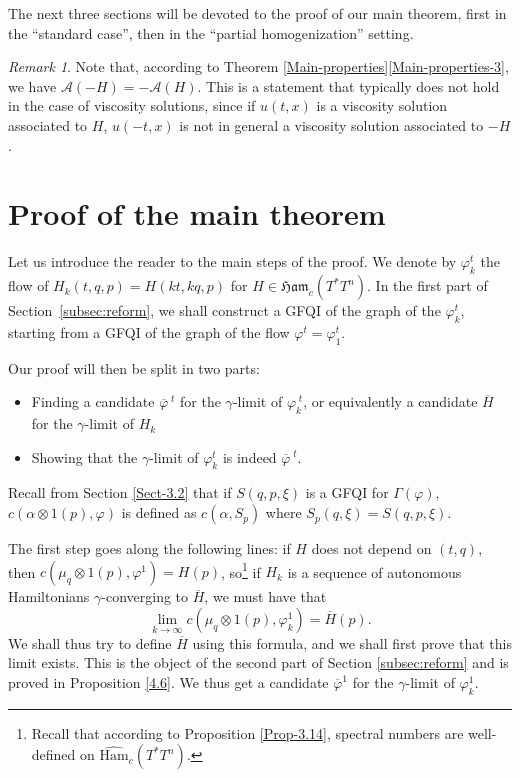 \documentclass[JEP,XML,SOM,NoFloatCountersInSection,Unicode,published]{cedram}
\numberwithin{equation}{section}
\newcommand {\Ham}{{\mathfrak {Ham}}}
\newcommand {\DHam}{\mathrm{Ham}}
\newcommand{\gclDHamc}[1]{\widehat{\DHam}_c(#1)}
\newcommand{\GFQI}{\textup{GFQI}\xspace}
\let \phi \varphi
\theoremstyle{plain}
\theoremstyle{definition}
\theoremstyle{remark}
\newtheorem{remark}[theorem]{Remark}
\begin{document}
The next three sections will be devoted to the proof of our main
theorem, first in the ``standard case'', then in the ``partial homogenization'' setting.

\begin{remark} \label{rem-4.7}
Note that, according to Theorem \ref{Main-properties}\eqref{Main-properties-3}, we have ${\mathcal A}(-H)= -{ \mathcal A }(H)$. This is a statement that typically does not hold in the case of viscosity solutions, since if $u(t,x)$ is a viscosity solution associated to $H$, $u(-t,x)$ is not in general a viscosity solution associated to $-H$.
\end{remark}
\section{Proof of the main theorem}\label{Main}

Let us introduce the reader to the main steps of the proof.
We denote by $\phi_{k}^t$ the flow of $H_k(t,q,p)=H(kt, kq,p)$ for $H \in \Ham_c(T^*T^n)$. In the first part of Section~\ref{subsec:reform}, we shall construct a \GFQI of the graph of the $\phi_{k}^t$, starting from a \GFQI of the graph of the flow $\phi^{t}=\phi_{1}^t$.

Our proof will then be split in two parts:

\begin{itemize}
\item Finding a candidate $\overline \phi^{\; t}$ for the $\gamma$-limit of $\phi_{k}^{\; t}$, or equivalently a candidate $\overline H$ for the $\gamma$-limit of $H_k$

\item Showing that the $\gamma$-limit of $\phi_{k}^{t}$ is indeed $\overline \phi^{\; t}$.
\end{itemize}

Recall from Section \ref{Sect-3.2} that if $S(q,p,\xi)$ is a \GFQI for $\Gamma (\varphi)$, $c(\alpha \otimes 1(p), \varphi)$ is defined as $c(\alpha, S_p)$ where $S_p(q,\xi)=S(q,p,\xi)$.

The first step goes along the following lines: if $H$ does not depend on $(t,q)$, then $c(\mu_{q}\otimes 1(p),\phi^1)=H(p)$, so\footnote{Recall that according to Proposition \ref{Prop-3.14}, spectral numbers are well-defined on $\gclDHamc {T^*T^n}$.} if $H_k$ is a sequence of autonomous Hamiltonians $\gamma$\nobreakdash-con\-verging to $\overline H$, we must have that
\[
\lim_{k\to \infty }c(\mu_{q}\otimes 1(p),\phi_{k}^1)={\overline H}(p).
\]
We shall thus try to define $\overline H$ using this formula, and we shall first prove that this limit exists. This is the object of the second part of Section \ref{subsec:reform} and is proved in Proposition \ref{4.6}. We thus get a candidate ${\overline\varphi}^{1}$ for the $\gamma$-limit of $\phi_{k}^1$.
\end{document}
